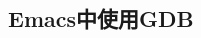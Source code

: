 \documentclass[class=book, crop=false]{standalone}
\begin{document}
\begin{CJK}{UTF8}{gbsn}

\chapter{Emacs中使用GDB}



\cleardoublepage

\end{CJK}
\end{document}
